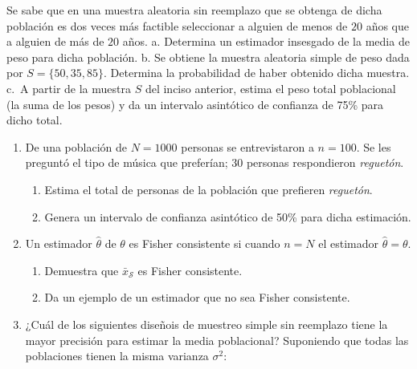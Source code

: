 \documentclass[
]{book}
\providecommand{\tightlist}{%
  \setlength{\itemsep}{0pt}\setlength{\parskip}{0pt}}
\begin{document}
Se sabe que en una muestra aleatoria sin reemplazo que se obtenga de dicha población es dos veces más factible seleccionar a alguien de menos de \(20\) años que a alguien de más de \(20\) años.
a. Determina un estimador insesgado de la media de peso para dicha población.
b. Se obtiene la muestra aleatoria simple de peso dada por \(S = \{50, 35, 85 \}\). Determina la probabilidad de haber obtenido dicha muestra.
c.~A partir de la muestra \(S\) del inciso anterior, estima el peso total poblacional (la suma de los pesos) y da un intervalo asintótico de confianza de 75\% para dicho total.

\begin{enumerate}
\def\labelenumi{\arabic{enumi}.}
\setcounter{enumi}{5}
\item
  De una población de \(N = 1000\) personas se entrevistaron a \(n = 100\). Se les preguntó el tipo de música que preferían; \(30\) personas respondieron \emph{reguetón}.

  \begin{enumerate}
  \def\labelenumii{\alph{enumii}.}
  \tightlist
  \item
    Estima el total de personas de la población que prefieren \textit{reguetón}.
  \item
    Genera un intervalo de confianza asintótico de 50\% para dicha estimación.
  \end{enumerate}
\item
  Un estimador \(\hat{\theta}\) de \(\theta\) es Fisher consistente si cuando \(n = N\) el estimador \(\hat{\theta} = \theta\).

  \begin{enumerate}
  \def\labelenumii{\alph{enumii}.}
  \tightlist
  \item
    Demuestra que \(\bar{x}_{\mathcal{S}}\) es Fisher consistente.
  \item
    Da un ejemplo de un estimador que no sea Fisher consistente.
  \end{enumerate}
\item
  ¿Cuál de los siguientes diseñois de muestreo simple sin reemplazo tiene la mayor precisión para estimar la media poblacional? Suponiendo que todas las poblaciones tienen la misma varianza \(\sigma^2\):


\end{enumerate}
\end{document}
